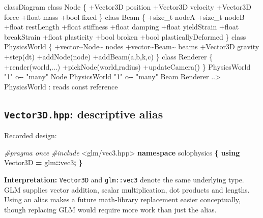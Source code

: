 \documentclass[
  10pt,
  a4paper,
]{article}
\newenvironment{Shaded}{\begin{snugshade}}{\end{snugshade}}
\newcommand{\ImportTok}[1]{#1}
\newcommand{\KeywordTok}[1]{\textcolor[rgb]{0.13,0.29,0.53}{\textbf{#1}}}
\newcommand{\NormalTok}[1]{#1}
\newcommand{\OperatorTok}[1]{\textcolor[rgb]{0.81,0.36,0.00}{\textbf{#1}}}
\newcommand{\PreprocessorTok}[1]{\textcolor[rgb]{0.56,0.35,0.01}{\textit{#1}}}
\begin{document}
\begin{Shaded}
\begin{Highlighting}[]
\NormalTok{classDiagram}
\NormalTok{class Node \{}
\NormalTok{  +Vector3D position}
\NormalTok{  +Vector3D velocity}
\NormalTok{  +Vector3D force}
\NormalTok{  +float mass}
\NormalTok{  +bool fixed}
\NormalTok{\}}
\NormalTok{class Beam \{}
\NormalTok{  +size\_t nodeA}
\NormalTok{  +size\_t nodeB}
\NormalTok{  +float restLength}
\NormalTok{  +float stiffness}
\NormalTok{  +float damping}
\NormalTok{  +float yieldStrain}
\NormalTok{  +float breakStrain}
\NormalTok{  +float plasticity}
\NormalTok{  +bool broken}
\NormalTok{  +bool plasticallyDeformed}
\NormalTok{\}}
\NormalTok{class PhysicsWorld \{}
\NormalTok{  +vector\textasciitilde{}Node\textasciitilde{} nodes}
\NormalTok{  +vector\textasciitilde{}Beam\textasciitilde{} beams}
\NormalTok{  +Vector3D gravity}
\NormalTok{  +step(dt)}
\NormalTok{  +addNode(node)}
\NormalTok{  +addBeam(a,b,k,c)}
\NormalTok{\}}
\NormalTok{class Renderer \{}
\NormalTok{  +render(world,...)}
\NormalTok{  +pickNode(world,radius)}
\NormalTok{  +updateCamera()}
\NormalTok{\}}
\NormalTok{PhysicsWorld "1" o{-}{-} "many" Node}
\NormalTok{PhysicsWorld "1" o{-}{-} "many" Beam}
\NormalTok{Renderer ..\textgreater{} PhysicsWorld : reads const reference}
\end{Highlighting}
\end{Shaded}

\subsection{\texorpdfstring{\texttt{Vector3D.hpp}: descriptive
alias}{Vector3D.hpp: descriptive alias}}\label{vector3d.hpp-descriptive-alias}

Recorded design:

\begin{Shaded}
\begin{Highlighting}[]
\PreprocessorTok{\#pragma once}
\PreprocessorTok{\#include }\ImportTok{\textless{}glm/vec3.hpp\textgreater{}}
\KeywordTok{namespace}\NormalTok{ solophysics }\OperatorTok{\{}
    \KeywordTok{using}\NormalTok{ Vector3D }\OperatorTok{=}\NormalTok{ glm}\OperatorTok{::}\NormalTok{vec3}\OperatorTok{;}
\OperatorTok{\}}
\end{Highlighting}
\end{Shaded}

\textbf{Interpretation:} \texttt{Vector3D} and \texttt{glm::vec3} denote
the same underlying type. GLM supplies vector addition, scalar
multiplication, dot products and lengths. Using an alias makes a future
math-library replacement easier conceptually, though replacing GLM would
require more work than just the alias.
\end{document}
